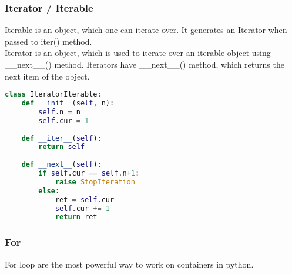 \documentclass[a4paper, 12pt, titlepage]{scrartcl} %
\begin{document}
\subsubsection{Iterator / Iterable}
Iterable is an object, which one can iterate over. It generates an Iterator when passed to iter() method. \\
Iterator is an object, which is used to iterate over an iterable object using \_\_next\_\_() method. Iterators have \_\_next\_\_() method, which returns the next item of the object.
\begin{lstlisting}[language=Python]
class IteratorIterable:
    def __init__(self, n):
        self.n = n
        self.cur = 1
        
    def __iter__(self):
        return self
        
    def __next__(self):
        if self.cur == self.n+1:
            raise StopIteration
        else:
            ret = self.cur
            self.cur += 1 
            return ret
\end{lstlisting} \vspace{5mm}

\subsubsection{For}
\label{subsec:For}
For loop are the most powerful way to work on containers in python.
\end{document}
